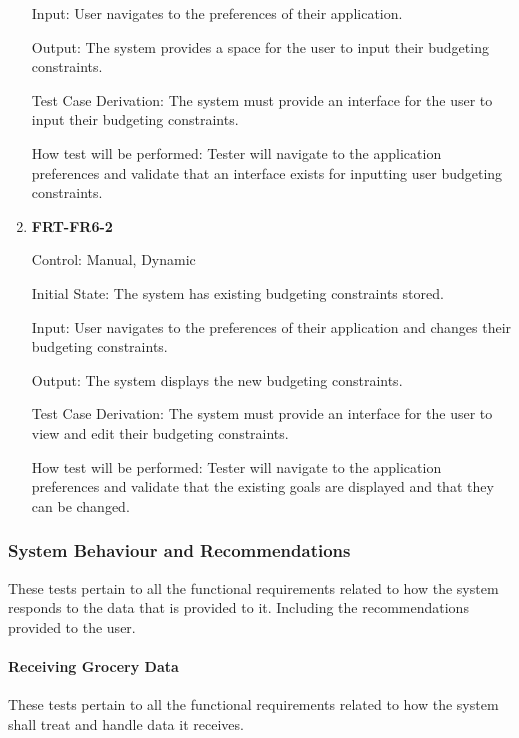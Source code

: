 \documentclass[12pt, titlepage]{article}
\begin{document}
\begin{enumerate}
Input: User navigates to the preferences of their application.
          
Output: The system provides a space for the user to input their budgeting constraints.

Test Case Derivation: The system must provide an interface for the user to input their budgeting constraints.
          
How test will be performed: Tester will navigate to the application preferences and validate that an interface exists for inputting user budgeting constraints.

\item{\textbf{FRT-FR6-2}}

Control: Manual, Dynamic
          
Initial State: The system has existing budgeting constraints stored.

Input: User navigates to the preferences of their application and changes their budgeting constraints.
          
Output: The system displays the new budgeting constraints.

Test Case Derivation: The system must provide an interface for the user to view and edit their budgeting constraints.

How test will be performed: Tester will navigate to the application preferences and validate that the existing goals are displayed and that they can be changed.

\end{enumerate}

\subsubsection{System Behaviour and Recommendations}

These tests pertain to all the functional requirements related to how the system responds to the data that is provided to it. Including the recommendations provided to the user.

\paragraph{Receiving Grocery Data}

These tests pertain to all the functional requirements related to how the system shall treat and handle data it receives.
\end{document}
